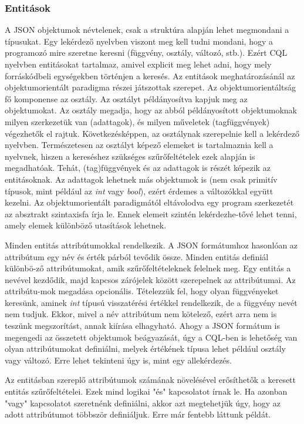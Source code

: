 \documentclass[a4paper,12pt]{report}
\begin{document}
\subsubsection{Entitások}
A JSON objektumok névtelenek, csak a struktúra alapján lehet megmondani a típusukat. Egy lekérdező nyelvben viszont meg kell tudni mondani, hogy a programozó mire szeretne keresni (függvény, osztály, változó, stb.). Ezért CQL nyelvben entitásokat tartalmaz, amivel explicit meg lehet adni, hogy mely forráskódbeli egységekben történjen a keresés. Az entitások meghatározásánál az objektumorientált paradigma részei játszottak szerepet. Az objektumorientáltság fő komponense az osztály. Az osztályt példányosítva kapjuk meg az objektumokat. Az osztály megadja, hogy az abból példányosított objektumoknak milyen szerkezetük van (adattagok), és milyen műveletek (tagfüggvények) végezhetők el rajtuk. Következésképpen, az osztálynak szerepelnie kell a lekérdező nyelvben. Természetesen az osztályt képező elemeket is tartalmaznia kell a nyelvnek, hiszen a kereséshez szükséges szűrőfeltételek ezek alapján is megadhatóak. Tehát, (tag)függvények és az adattagok is részét képezik az entitásoknak. Az adattagok lehetnek más objektumok is (nem csak primitív típusok, mint például az \textit{int} vagy \textit{bool}), ezért érdemes a változókkal együtt kezelni. Az objektumorientált paradigmától eltávolodva egy program szerkezetét az absztrakt szintaxisfa írja le. Ennek elemeit szintén lekérdezhe-tővé lehet tenni, amely elemek különböző utasítások lehetnek.
\par Minden entitás attribútumokkal rendelkezik. A JSON formátumhoz hasonlóan az attribútum egy név és érték párból tevődik össze. Minden entitás definiál különbö-ző attribútumokat, amik szűrőfeltételeknek felelnek meg. Egy entitás a nevével kezdődik, majd kapcsos zárójelek között szerepelnek az attribútumai. Az attribútu-mok megadása opcionális. Tételezzük fel, hogy olyan függvényeket keresünk, aminek \textit{int} típusú visszatérési értékkel rendelkezik, de a függvény nevét nem tudjuk. Ekkor, mivel a név attribútum nem kötelező, ezért arra nem is teszünk megszorítást, annak kiírása elhagyható. Ahogy a JSON formátum is megengedi az összetett objektumok beágyazását, úgy a CQL-ben is lehetőség van olyan attribútumokat definiálni, melyek értékének típusa lehet például osztály vagy változó. Erre lehet tekinteni úgy is, mint egy allekérdezés.
\par Az entitásban szereplő attribútumok számának növelésével erősíthetők a keresett entitás szűrőfeltételei. Ezek mind logikai "és" kapcsolatot írnak le. Ha azonban "vagy" kapcsolatot szeretnénk definiálni, akkor azt megtehetjük úgy, hogy az adott attribútumot többször definiáljuk. Erre már fentebb láttunk példát.
\end{document}

